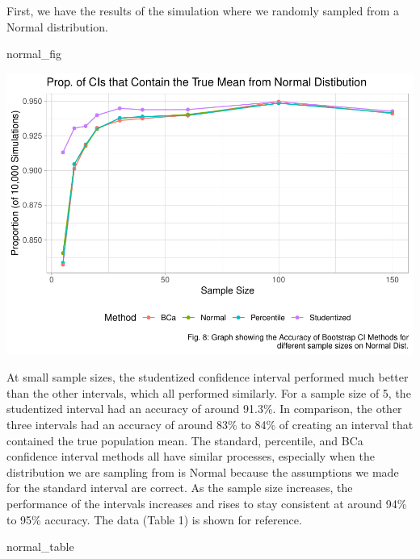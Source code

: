 \documentclass[12pt]{article}
\newenvironment{Shaded}{\begin{snugshade}}{\end{snugshade}}
\newcommand{\NormalTok}[1]{#1}
\begin{document}
First, we have the results of the simulation where we randomly sampled
from a Normal distribution.

\begin{Shaded}
\begin{Highlighting}[]
\NormalTok{normal\_fig}
\end{Highlighting}
\end{Shaded}

\includegraphics{paper_files/figure-latex/unnamed-chunk-18-1.pdf}

At small sample sizes, the studentized confidence interval performed
much better than the other intervals, which all performed similarly. For
a sample size of 5, the studentized interval had an accuracy of around
91.3\%. In comparison, the other three intervals had an accuracy of
around 83\% to 84\% of creating an interval that contained the true
population mean. The standard, percentile, and BCa confidence interval
methods all have similar processes, especially when the distribution we
are sampling from is Normal because the assumptions we made for the
standard interval are correct. As the sample size increases, the
performance of the intervals increases and rises to stay consistent at
around 94\% to 95\% accuracy. The data (Table 1) is shown for reference.

\begin{Shaded}
\begin{Highlighting}[]
\NormalTok{normal\_table}
\end{Highlighting}
\end{Shaded}
\end{document}
